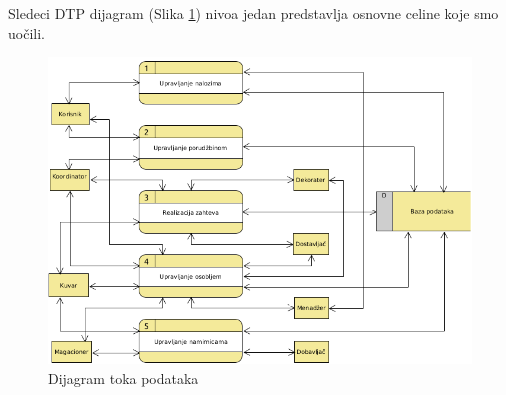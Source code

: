 Sledeci DTP dijagram (Slika \ref{fig:slika2}) nivoa jedan predstavlja osnovne celine koje smo uočili. 
\begin{figure}[ht]
    \leavevmode
    \begin{center}
    \includegraphics[height=0.58\textheight]{slike/DTP.png}
    \end{center}
    \caption{Dijagram toka podataka} %
    \label{fig:slika2}
\end{figure}
